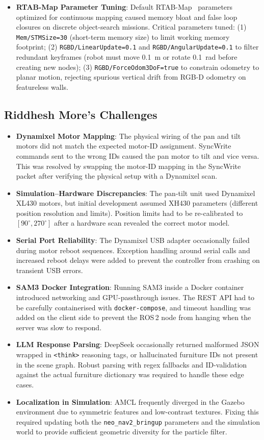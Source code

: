 \documentclass[12pt,oneside,a4paper]{article}
\begin{document}
\begin{itemize}
    \item \textbf{RTAB-Map Parameter Tuning}: Default RTAB-Map~\cite{labbe2013rtabmap} parameters optimized for continuous mapping caused memory bloat and false loop closures on discrete object-search missions. Critical parameters tuned: (1) \texttt{Mem/STMSize=30} (short-term memory size) to limit working memory footprint; (2) \texttt{RGBD/LinearUpdate=0.1} and \texttt{RGBD/AngularUpdate=0.1} to filter redundant keyframes (robot must move 0.1~m or rotate 0.1~rad before creating new nodes); (3) \texttt{RGBD/ForceOdom3DoF=true} to constrain odometry to planar motion, rejecting spurious vertical drift from RGB-D odometry on featureless walls.
\end{itemize}

\subsection{Riddhesh More's Challenges}
\begin{itemize}
    \item \textbf{Dynamixel Motor Mapping}: The physical wiring of the pan and tilt motors did not match the expected motor-ID assignment. SyncWrite commands sent to the wrong IDs caused the pan motor to tilt and vice versa. This was resolved by swapping the motor-ID mapping in the SyncWrite packet after verifying the physical setup with a Dynamixel scan.
    \item \textbf{Simulation--Hardware Discrepancies}: The pan-tilt unit used Dynamixel XL430 motors, but initial development assumed XH430 parameters (different position resolution and limits). Position limits had to be re-calibrated to $[90^\circ, 270^\circ]$ after a hardware scan revealed the correct motor model.
    \item \textbf{Serial Port Reliability}: The Dynamixel USB adapter occasionally failed during motor reboot sequences. Exception handling around serial calls and increased reboot delays were added to prevent the controller from crashing on transient USB errors.
    \item \textbf{SAM3 Docker Integration}: Running SAM3 inside a Docker container introduced networking and GPU-passthrough issues. The REST API had to be carefully containerised with \texttt{docker-compose}, and timeout handling was added on the client side to prevent the ROS\,2 node from hanging when the server was slow to respond.
    \item \textbf{LLM Response Parsing}: DeepSeek occasionally returned malformed JSON wrapped in \texttt{<think>} reasoning tags, or hallucinated furniture IDs not present in the scene graph. Robust parsing with regex fallbacks and ID-validation against the actual furniture dictionary was required to handle these edge cases.
    \item \textbf{Localization in Simulation}: AMCL frequently diverged in the Gazebo environment due to symmetric features and low-contrast textures. Fixing this required updating both the \texttt{neo\_nav2\_bringup} parameters and the simulation world to provide sufficient geometric diversity for the particle filter.

\end{itemize}
\end{document}
